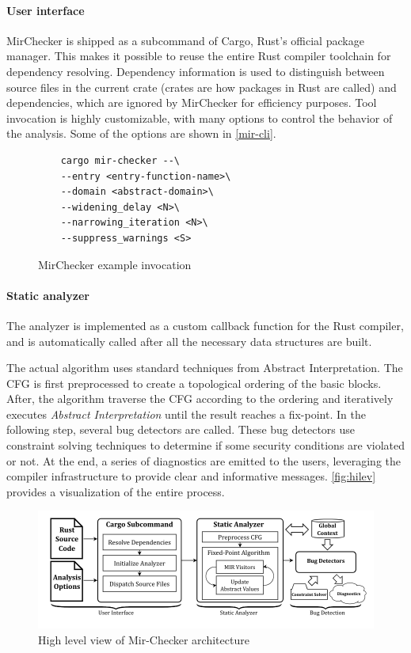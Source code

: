 \documentclass{article}
\begin{document}
\paragraph*{User interface} MirChecker is shipped as a subcommand of  
Cargo, Rust's official package manager. This makes it possible to reuse the entire
Rust compiler toolchain for dependency resolving. Dependency information is used 
to distinguish between source files in the current crate (crates are how packages in Rust are called) and dependencies, which are ignored 
by MirChecker for efficiency purposes. Tool invocation is highly customizable, with many options 
to control the behavior of the analysis. Some of the options are shown in \autoref{mir-cli}.
\begin{figure}[H]
\begin{verbatim}
    cargo mir-checker --\ 
    --entry <entry-function-name>\
    --domain <abstract-domain>\ 
    --widening_delay <N>\
    --narrowing_iteration <N>\ 
    --suppress_warnings <S>
\end{verbatim}
    \caption{MirChecker example invocation}
    \label{mir-cli}

\end{figure}


\paragraph*{Static analyzer}
The analyzer is implemented as a custom callback function for the Rust compiler, and is 
automatically called after all the necessary data structures are built. 

The actual algorithm uses standard techniques from Abstract Interpretation.
The CFG is first preprocessed to create a topological ordering of the basic blocks. After, the algorithm traverse the CFG according to the ordering 
and iteratively executes \textit{Abstract Interpretation} until the result reaches a fix-point.
In the following step, several bug detectors are called. These bug detectors use 
constraint solving techniques to determine if some security conditions are violated or not. At the end, a series of 
diagnostics are emitted to the users, leveraging the compiler infrastructure to provide clear and informative messages.
\autoref{fig:hilev} provides a visualization of the entire process.
\begin{figure}[H]
    \includegraphics[scale=0.5]{hilev.png}
    \caption{High level view of Mir-Checker architecture}
    \label{fig:hilev}
\end{figure}
\end{document}
